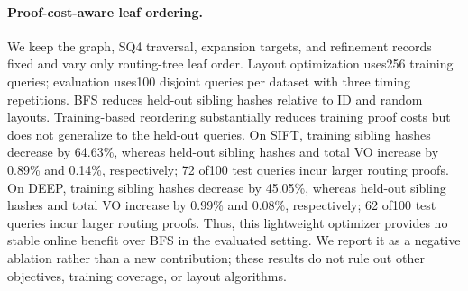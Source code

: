 \paragraph{Proof-cost-aware leaf ordering.}
We keep the graph, SQ4 traversal, expansion targets, and refinement records fixed and vary only routing-tree leaf order. Layout optimization uses256 training queries; evaluation uses100 disjoint queries per dataset with three timing repetitions. BFS reduces held-out sibling hashes relative to ID and random layouts. Training-based reordering substantially reduces training proof costs but does not generalize to the held-out queries.
On \textsf{SIFT}, training sibling hashes decrease by 64.63\%, whereas held-out sibling hashes and total VO increase by 0.89\% and 0.14\%, respectively; 72 of100 test queries incur larger routing proofs.
On \textsf{DEEP}, training sibling hashes decrease by 45.05\%, whereas held-out sibling hashes and total VO increase by 0.99\% and 0.08\%, respectively; 62 of100 test queries incur larger routing proofs.
Thus, this lightweight optimizer provides no stable online benefit over BFS in the evaluated setting. We report it as a negative ablation rather than a new contribution; these results do not rule out other objectives, training coverage, or layout algorithms.
